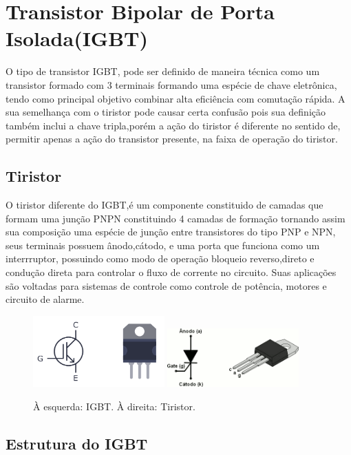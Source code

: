 \documentclass[12pt]{article}
\begin{document}
\section{Transistor Bipolar de Porta Isolada(IGBT)}

    O tipo de transistor IGBT, pode ser definido de maneira técnica como um transistor formado com 3 terminais formando uma espécie de chave eletrônica, tendo como principal objetivo combinar alta eficiência com comutação rápida. A sua semelhança com o tiristor pode causar certa confusão pois sua definição também inclui a chave tripla,porém a ação do tiristor é diferente no sentido de, permitir apenas a ação do transistor presente, na faixa de operação do tiristor.

        \subsection{Tiristor}

        O tiristor diferente do IGBT,é um componente constituido de camadas que formam uma junção PNPN constituindo 4 camadas de formação tornando assim sua composição uma espécie de junção entre transistores do tipo PNP e NPN, seus terminais possuem ânodo,cátodo, e uma porta que funciona como um interrruptor, possuindo como modo de operação bloqueio reverso,direto e condução direta para controlar o fluxo de corrente no circuito. Suas aplicações são voltadas para sistemas de controle como controle de potência, motores e circuito de alarme.

        \begin{figure}[H]
            \centering
            \includegraphics[width=0.45\textwidth]{./images/IGBT.png}
            \includegraphics[width=0.45\textwidth]{./images/tiristor.png}
        \caption{À esquerda: IGBT. À direita: Tiristor.}
        \end{figure}
        \subsection{Estrutura do IGBT}
\end{document}
